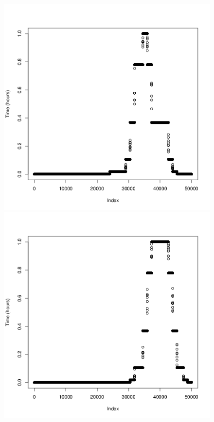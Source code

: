 \documentclass[a4paper, 12pt]{article}
\begin{document}
\begin{figure}[H]
\begin{minipage}[]{0.2\textwidth}
        \end{minipage}
        \begin{minipage}[]{0.2\textwidth}
            \includegraphics[width=\textwidth]{share/7_time.png}
        \end{minipage}
        \begin{minipage}[]{0.2\textwidth}
             \includegraphics[width=\textwidth]{share/8_time.png}

\end{minipage}
\end{figure}
\end{document}
